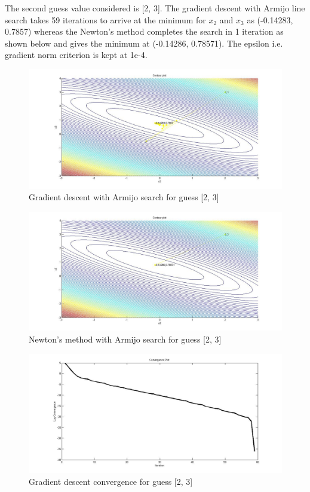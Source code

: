 \documentclass[12pt]{article}
\begin{document}
The second guess value considered is [2, 3]. The gradient descent with Armijo line search takes 59 iterations to arrive at the minimum for $x_{2}$ and $x_{3}$ as (-0.14283, 0.7857) whereas the Newton's method completes the search in 1 iteration as shown below and gives the minimum at (-0.14286, 0.78571). The epsilon i.e. gradient norm criterion is kept at 1e-4.
\begin{figure}[H]
\begin{center}
\includegraphics[scale=0.375]{contour1g.jpg}
\caption{Gradient descent with Armijo search for guess [2, 3]}  
\end{center}
\end{figure}
\begin{figure}[H]
\begin{center}
\includegraphics[scale=0.375]{contour1n.jpg}
\caption{Newton's method with Armijo search for guess [2, 3]}  
\end{center}
\end{figure}
\begin{figure}[H]
\begin{center}
\includegraphics[scale=0.375]{conv1g.jpg}
\caption{Gradient descent convergence for guess [2, 3]}  
\end{center}
\end{figure}
\end{document}
